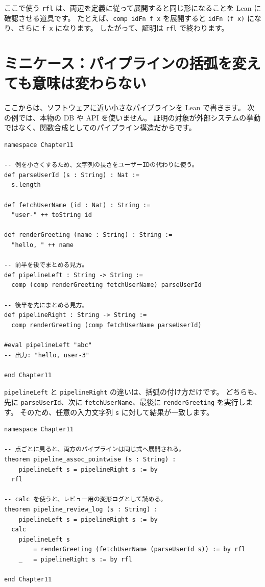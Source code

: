 ここで使う \texttt{rfl} は、両辺を定義に従って展開すると同じ形になることを Lean に確認させる道具です。
たとえば、\texttt{comp idFn f x} を展開すると \texttt{idFn (f x)} になり、さらに \texttt{f x} になります。
したがって、証明は \texttt{rfl} で終わります。

\section{ミニケース：パイプラインの括弧を変えても意味は変わらない}

ここからは、ソフトウェアに近い小さなパイプラインを Lean で書きます。
次の例では、本物の DB や API を使いません。
証明の対象が外部システムの挙動ではなく、関数合成としてのパイプライン構造だからです。

\begin{listing}[htbp]
\begin{verbatim}
namespace Chapter11

-- 例を小さくするため、文字列の長さをユーザーIDの代わりに使う。
def parseUserId (s : String) : Nat :=
  s.length

def fetchUserName (id : Nat) : String :=
  "user-" ++ toString id

def renderGreeting (name : String) : String :=
  "hello, " ++ name

-- 前半を後でまとめる見方。
def pipelineLeft : String -> String :=
  comp (comp renderGreeting fetchUserName) parseUserId

-- 後半を先にまとめる見方。
def pipelineRight : String -> String :=
  comp renderGreeting (comp fetchUserName parseUserId)

#eval pipelineLeft "abc"
-- 出力: "hello, user-3"

end Chapter11
\end{verbatim}
\caption{\texttt{pipelineLeft} と \texttt{pipelineRight}}
\label{lst:ch11_pipeline}
\end{listing}

\texttt{pipelineLeft} と \texttt{pipelineRight} の違いは、括弧の付け方だけです。
どちらも、先に \texttt{parseUserId}、次に \texttt{fetchUserName}、最後に \texttt{renderGreeting} を実行します。
そのため、任意の入力文字列 \texttt{s} に対して結果が一致します。

\begin{listing}[htbp]
\begin{verbatim}
namespace Chapter11

-- 点ごとに見ると、両方のパイプラインは同じ式へ展開される。
theorem pipeline_assoc_pointwise (s : String) :
    pipelineLeft s = pipelineRight s := by
  rfl

-- calc を使うと、レビュー用の変形ログとして読める。
theorem pipeline_review_log (s : String) :
    pipelineLeft s = pipelineRight s := by
  calc
    pipelineLeft s
        = renderGreeting (fetchUserName (parseUserId s)) := by rfl
    _   = pipelineRight s := by rfl

end Chapter11
\end{verbatim}
\caption{\texttt{pipeline\_assoc\_pointwise} と \texttt{pipeline\_review\_log}}
\label{lst:ch11_pipeline_proof}
\end{listing}

